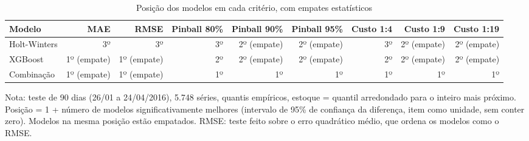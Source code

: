 \begin{table}[htbp]
\centering
\small
\caption{Posição dos modelos em cada critério, com empates estatísticos}
\label{tab:comp_ordenacao}
\begin{tabular}{lrrrrrrrr}
\toprule
Modelo & MAE & RMSE & Pinball 80\% & Pinball 90\% & Pinball 95\% & Custo 1:4 & Custo 1:9 & Custo 1:19 \\
\midrule
Holt-Winters & 3º & 3º & 3º & 2º (empate) & 2º (empate) & 3º & 2º (empate) & 2º (empate) \\
XGBoost & 1º (empate) & 1º (empate) & 2º & 2º (empate) & 2º (empate) & 2º & 2º (empate) & 2º (empate) \\
Combinação & 1º (empate) & 1º (empate) & 1º & 1º & 1º & 1º & 1º & 1º \\
\bottomrule
\end{tabular}
\par\smallskip
{\footnotesize Nota: teste de 90 dias (26/01 a 24/04/2016), 5.748 séries, quantis empíricos, estoque = quantil arredondado para o inteiro mais próximo. Posição = 1 + número de modelos significativamente melhores (intervalo de 95\% de confiança da diferença, item como unidade, sem conter zero). Modelos na mesma posição estão empatados. RMSE: teste feito sobre o erro quadrático médio, que ordena os modelos como o RMSE.}
\end{table}
